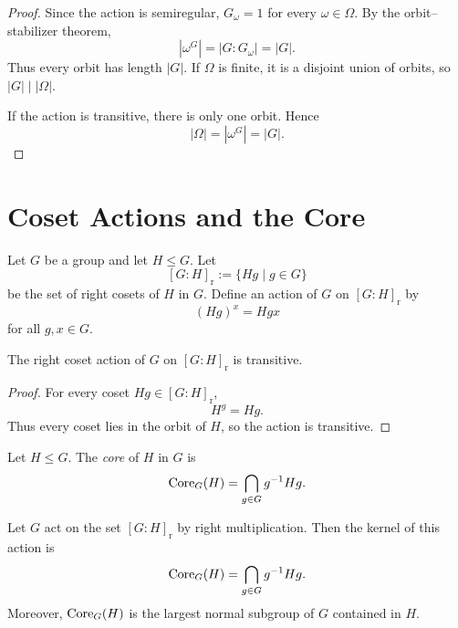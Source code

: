\begin{proof}
Since the action is semiregular, \(G_\omega=1\) for every \(\omega\in\Omega\). By the orbit--stabilizer theorem,
\[
    |\omega^G|=|G:G_\omega|=|G|.
\]
Thus every orbit has length \(|G|\). If \(\Omega\) is finite, it is a disjoint union of orbits, so \(|G|\mid |\Omega|\).

If the action is transitive, there is only one orbit. Hence
\[
    |\Omega|=|\omega^G|=|G|.
\]
\end{proof}

\section{Coset Actions and the Core}

\begin{definition}
Let \(G\) be a group and let \(H\leq G\). Let
\[
    [G:H]_{\mathrm r}:=\{Hg\mid g\in G\}
\]
be the set of right cosets of \(H\) in \(G\). Define an action of \(G\) on \([G:H]_{\mathrm r}\) by
\[
    (Hg)^x=Hgx
\]
for all \(g,x\in G\).
\end{definition}

\begin{proposition}
The right coset action of \(G\) on \([G:H]_{\mathrm r}\) is transitive.
\end{proposition}

\begin{proof}
For every coset \(Hg\in [G:H]_{\mathrm r}\),
\[
    H^g=Hg.
\]
Thus every coset lies in the orbit of \(H\), so the action is transitive.
\end{proof}

\begin{definition}[Core]
Let \(H\leq G\). The \emph{core} of \(H\) in \(G\) is
\[
    \operatorname{Core}_G(H)
    =
    \bigcap_{g\in G} g^{-1}Hg.
\]
\end{definition}

\begin{proposition}
Let \(G\) act on the set \([G:H]_{\mathrm r}\) by right multiplication. Then the kernel of this action is
\[
    \operatorname{Core}_G(H)=\bigcap_{g\in G}g^{-1}Hg.
\]
Moreover, \(\operatorname{Core}_G(H)\) is the largest normal subgroup of \(G\) contained in \(H\).
\end{proposition}

